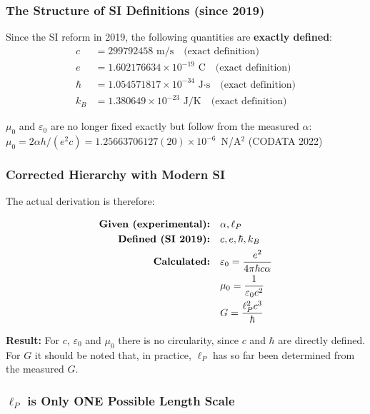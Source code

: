 	\subsubsection{The Structure of SI Definitions (since 2019)}
	
	\begin{tcolorbox}[colback=green!5!white,colframe=green!75!black,title=Modern SI Base]
		Since the SI reform in 2019, the following quantities are \textbf{exactly defined}:
		\begin{align}
			c &= 299792458 \text{ m/s} \quad \text{(exact definition)}\\
			e &= 1.602176634 \times 10^{-19} \text{ C} \quad \text{(exact definition)}\\
			\hbar &= 1.054571817 \times 10^{-34} \text{ J·s} \quad \text{(exact definition)}\\
			k_B &= 1.380649 \times 10^{-23} \text{ J/K} \quad \text{(exact definition)}
		\end{align}
		
		$\mu_0$ and $\varepsilon_0$ are no longer fixed exactly but follow from the measured $\alpha$: $\mu_0 = 2\alpha h/(e^2 c) = 1.25663706127(20)\times10^{-6}$~N/A$^2$ (CODATA 2022)
	\end{tcolorbox}
	
	\subsubsection{Corrected Hierarchy with Modern SI}
	
	The actual derivation is therefore:
	
	\begin{align}
		\text{\textbf{Given (experimental):}} &\quad \alpha, \ell_P\\
		\text{\textbf{Defined (SI 2019):}} &\quad c, e, \hbar, k_B\\
		\text{\textbf{Calculated:}} &\quad \varepsilon_0 = \frac{e^2}{4\pi\hbar c \alpha}\\
		&\quad \mu_0 = \frac{1}{\varepsilon_0 c^2}\\
		&\quad G = \frac{\ell_P^2 c^3}{\hbar}
	\end{align}
	
	\textbf{Result:} For $c$, $\varepsilon_0$ and $\mu_0$ there is no circularity, since $c$ and $\hbar$ are directly defined. For $G$ it should be noted that, in practice, $\ell_P$ has so far been determined from the measured $G$.
	
	\subsubsection{$\ell_P$ is Only ONE Possible Length Scale}
	
